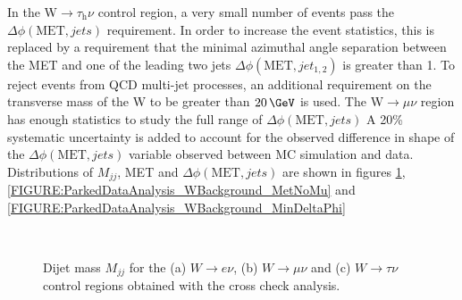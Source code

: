 In the W$\rightarrow\tau_{\mathrm{h}}\nu$ control region, a very small number of events pass the $\Delta\phi(\text{MET},jets)$ requirement. In order to increase the event statistics, this is replaced by a requirement that the minimal azimuthal angle separation between the \gls{MET} and one of the leading two jets $\Delta\phi(\text{MET},jet_{1,2})$ is greater than 1. To reject events from \gls{QCD} multi-jet processes, an additional requirement on the transverse mass of the W to be greater than $20\,\GeV$ is used. The W$\rightarrow\mu\nu$ region has enough statistics to study the full range of $\Delta\phi(\text{MET},jets)$ A 20\% systematic uncertainty is added to account for the observed difference in shape of the $\Delta\phi(\text{MET},jets)$ variable observed between \gls{MC} simulation and data. Distributions of $M_{jj}$, \gls{MET} and $\Delta\phi(\text{MET},jets)$ are shown in figures \ref{FIGURE:ParkedDataAnalysis_WBackground_Mjj}, \ref{FIGURE:ParkedDataAnalysis_WBackground_MetNoMu} and \ref{FIGURE:ParkedDataAnalysis_WBackground_MinDeltaPhi}

\begin{figure}[!htb]
\centering
{}
 \\
\caption{Dijet mass $M_{jj}$ for the (a) $W\rightarrow e\nu$, (b) $W\rightarrow\mu\nu$ and (c) $W\rightarrow\tau\nu$ control regions obtained with the cross check analysis.}
\label{FIGURE:ParkedDataAnalysis_WBackground_Mjj}
\end{figure}


